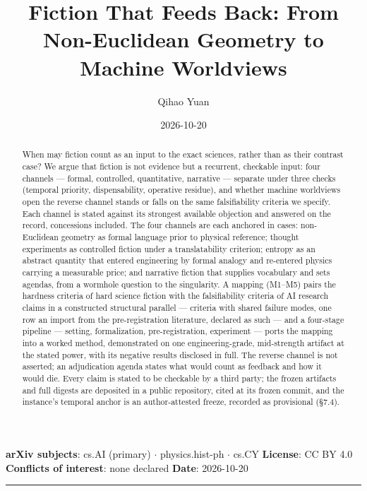 \documentclass[11pt,a4paper]{article}
\title{Fiction That Feeds Back: From Non-Euclidean Geometry to Machine Worldviews}
\author{Qihao Yuan}
\date{2026-10-20}
\begin{document}
\maketitle
\thispagestyle{empty}
\vspace{0.5em}
\noindent\textbf{arXiv subjects}: cs.AI (primary) $\cdot$ physics.hist-ph $\cdot$ cs.CY \quad \textbf{License}: CC BY 4.0 \quad \textbf{Conflicts of interest}: none declared \quad \textbf{Date}: 2026-10-20
\vspace{0.5em}
\hrule
\vspace{0.8em}

\begin{abstract}


When may fiction count as an input to the exact sciences, rather than as their contrast case? We argue that fiction is not evidence but a recurrent, checkable input: four channels — formal, controlled, quantitative, narrative — separate under three checks (temporal priority, dispensability, operative residue), and whether machine worldviews open the reverse channel stands or falls on the same falsifiability criteria we specify. Each channel is stated against its strongest available objection and answered on the record, concessions included. The four channels are each anchored in cases: non-Euclidean geometry as formal language prior to physical reference; thought experiments as controlled fiction under a translatability criterion; entropy as an abstract quantity that entered engineering by formal analogy and re-entered physics carrying a measurable price; and narrative fiction that supplies vocabulary and sets agendas, from a wormhole question to the singularity. A mapping (M1–M5) pairs the hardness criteria of hard science fiction with the falsifiability criteria of AI research claims in a constructed structural parallel — criteria with shared failure modes, one row an import from the pre-registration literature, declared as such — and a four-stage pipeline — setting, formalization, pre-registration, experiment — ports the mapping into a worked method, demonstrated on one engineering-grade, mid-strength artifact at the stated power, with its negative results disclosed in full. The reverse channel is not asserted; an adjudication agenda states what would count as feedback and how it would die. Every claim is stated to be checkable by a third party; the frozen artifacts and full digests are deposited in a public repository, cited at its frozen commit, and the instance's temporal anchor is an author-attested freeze, recorded as provisional (§7.4).

\end{abstract}
\end{document}
